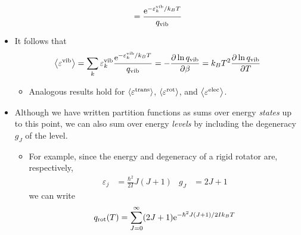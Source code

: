 \documentclass[../notes.tex]{subfiles}
\begin{document}
\begin{itemize}
\begin{equation*}
        = \frac{\e[-\varepsilon_k^\text{vib}/k_BT]}{q_\text{vib}}
    \end{equation*}
    \item It follows that
    \begin{equation*}
        \prb{\varepsilon^\text{vib}} = \sum_k\varepsilon_k^\text{vib}\frac{\e[-\varepsilon_k^\text{vib}/k_BT]}{q_\text{vib}}
        = -\pdv{\ln q_\text{vib}}{\beta}
        = k_BT^2\pdv{\ln q_\text{vib}}{T}
    \end{equation*}
    \begin{itemize}
        \item Analogous results hold for $\prb{\varepsilon^\text{trans}}$, $\prb{\varepsilon^\text{rot}}$, and $\prb{\varepsilon^\text{elec}}$.
    \end{itemize}
    \item Although we have written partition functions as sums over energy \emph{states} up to this point, we can also sum over energy \emph{levels} by including the degeneracy $g_J$ of the level.
    \begin{itemize}
        \item For example, since the energy and degeneracy of a rigid rotator are, respectively,
        \begin{align*}
            \varepsilon_j &= \frac{\hbar^2}{2I}J(J+1)&
            g_J &= 2J+1
        \end{align*}
        we can write
        \begin{equation*}
            q_\text{rot}(T) = \sum_{J=0}^\infty(2J+1)\e[-\hbar^2J(J+1)/2Ik_BT]
        \end{equation*}
    \end{itemize}
\end{itemize}
\end{document}
